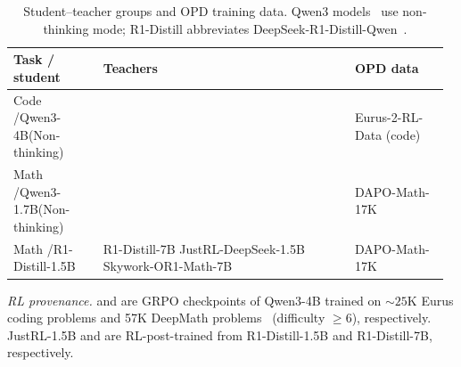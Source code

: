 \begin{table}[htbp]
 \centering
 \normalsize
 \setlength{\tabcolsep}{3pt}
 \renewcommand{\arraystretch}{1.15}
 \caption{Student--teacher groups and OPD training data. Qwen3
 models~\citep{yang2025qwen3} use non-thinking mode; R1-Distill abbreviates
 DeepSeek-R1-Distill-Qwen~\citep{guo2025deepseek}.}
 \label{tab:teacher-setup}
 \begin{tabular}{@{}p{0.20\linewidth}p{0.56\linewidth}p{0.21\linewidth}@{}}
  \hline
  \textbf{Task / student} & \textbf{Teachers} & \textbf{OPD data} \\
  \hline
  \raggedright Code /\newline Qwen3-4B\newline (Non-thinking)
   & \QwenFourteenNT{}\newline \QwenRLCode{}~\citep{yang2026learning}
   & \raggedright Eurus-2-RL-Data (code)~\citep{cui2025process} \tabularnewline
  \hline
  \raggedright Math /\newline Qwen3-1.7B\newline (Non-thinking)
   & \QwenFourNT{}\newline \QwenRLMath{}~\citep{yang2026learning}
   & \raggedright DAPO-Math-17K~\citep{yu2026dapo} \tabularnewline
  \hline
  Math /\newline R1-Distill-1.5B
   & R1-Distill-7B\newline
     JustRL-DeepSeek-1.5B~\citep{he2025justrl}\newline
     Skywork-OR1-Math-7B~\citep{he2025skywork}
   & \raggedright DAPO-Math-17K \tabularnewline
  \hline
 \end{tabular}
 \par\vspace{3pt}
 \begin{minipage}{\linewidth}
  \normalsize
  \textit{RL provenance.} \QwenRLCode{} and \QwenRLMath{} are GRPO checkpoints of
  Qwen3-4B trained on ${\sim}25$K Eurus coding problems and 57K
  DeepMath problems~\citep{he2026deepmath} (difficulty $\geq6$), respectively.
  JustRL-1.5B and \SkyworkTeacher{} are RL-post-trained from R1-Distill-1.5B and
  R1-Distill-7B, respectively.
 \end{minipage}
\end{table}
